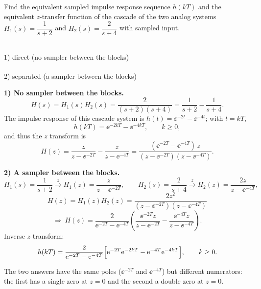 \begin{example}
Find the equivalent sampled impulse response sequence $h(kT)$ and the equivalent $z$-transfer function of the
cascade of the two analog systems $H_1(s)=\dfrac{1}{s+2}$ and $H_2(s)=\dfrac{2}{s+4}$ with sampled input.

\begin{center}
\resizebox{0.78\linewidth}{!}{\figCascadeNS}\\[1mm]
{\small 1) direct (no sampler between the blocks)}\\[3mm]
\resizebox{0.9\linewidth}{!}{\figCascadeS}\\[1mm]
{\small 2) separated (a sampler between the blocks)}
\end{center}

\textbf{1) No sampler between the blocks.}
\[
  H(s)=H_1(s)H_2(s)=\frac{2}{(s+2)(s+4)}=\frac{1}{s+2}-\frac{1}{s+4}.
\]
The impulse response of this cascade system is $h(t)=\ee^{-2t}-\ee^{-4t}$; with $t=kT$,
\[
  h(kT)=\ee^{-2kT}-\ee^{-4kT},\qquad k\ge0,
\]
and thus the $z$ transform is
\[
  H(z)=\frac{z}{z-\ee^{-2T}}-\frac{z}{z-\ee^{-4T}}=\frac{(\ee^{-2T}-\ee^{-4T})\,z}{(z-\ee^{-2T})(z-\ee^{-4T})}.
\]

\textbf{2) A sampler between the blocks.}
\[
  H_1(s)=\frac{1}{s+2}\xrightarrow{\ z\ }H_1(z)=\frac{z}{z-\ee^{-2T}},\qquad
  H_2(s)=\frac{2}{s+4}\xrightarrow{\ z\ }H_2(z)=\frac{2z}{z-\ee^{-4T}},
\]
\[
  H(z)=H_1(z)H_2(z)=\frac{2z^{2}}{(z-\ee^{-2T})(z-\ee^{-4T})}
\]
\[
  \Rightarrow\ H(z)=\frac{2}{\ee^{-2T}-\ee^{-4T}}\left(\frac{\ee^{-2T}z}{z-\ee^{-2T}}-\frac{\ee^{-4T}z}{z-\ee^{-4T}}\right).
\]
Inverse $z$ transform:
\[
  h(kT)=\frac{2}{\mathrm{e}^{-2T}-\mathrm{e}^{-4T}}\Bigl[\mathrm{e}^{-2T}\mathrm{e}^{-2kT}-\mathrm{e}^{-4T}\mathrm{e}^{-4kT}\Bigr],\qquad k\ge0.
\]
\end{example}

The two answers have the same poles ($\ee^{-2T}$ and $\ee^{-4T}$) but different numerators: the first has
a single zero at $z=0$ and the second a double zero at $z=0$.

